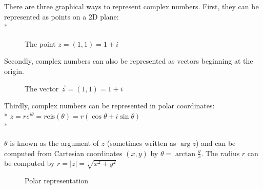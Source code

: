\documentclass[]{article}
\begin{document}
	    \noindent There are three graphical ways to represent complex numbers. First, they can be represented as points on a 2D plane: \\* 
	    
	    \begin{figure}[!h]
	    	\centering
      	    \caption{The point $z=(1,1)=1+i$}
      	\end{figure}
	    
	    \noindent Secondly, complex numbers can also be represented as vectors beginning at the origin.
	    \begin{figure}[!h]
	    	\centering
            \caption{The vector $\vec{z}=(1,1)=1+i$}
        \end{figure}
    
        \noindent Thirdly, complex numbers can be represented in polar coordinates: \\*  
        \noindent $z=re^{i\theta}=r\mathrm{cis}(\theta)=r(\cos{\theta}+i\sin{\theta})$ \\*
    
        \noindent $\theta$ is known as the argument of $z$ (sometimes written as $\arg{z}$) and can be computed from Cartesian coordinates $(x,y)$ by $\theta=\arctan{\frac{y}{x}}$. The radius $r$ can be computed by $r=\left|z\right|=\sqrt{x^2+y^2}$
        
        \begin{figure}[!h]
        	\centering
        	\caption{Polar representation}
        \end{figure}
    
\end{document}
